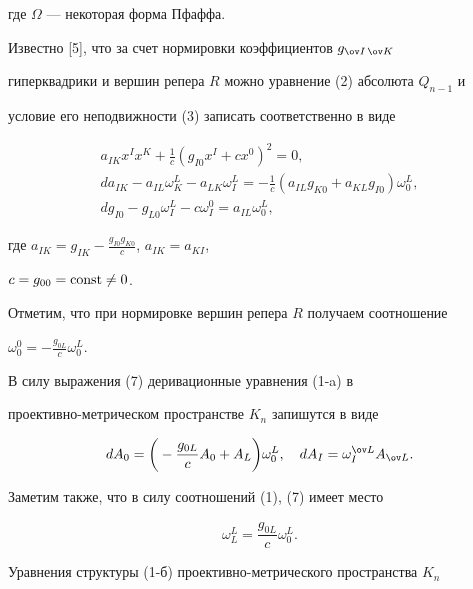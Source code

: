 где $\Omega$ --- некоторая форма Пфаффа. 


 


Известно [5], что за счет нормировки коэффициентов $g_{\ov I\,\ov K}$ 


гиперквадрики и вершин репера $R$ можно уравнение (2) абсолюта $Q_{n-1}$ и 


условие его неподвижности (3) записать соответственно в виде 


\begin{gather} 


a_{IK}x^I x^K+\frac{1}{c}(g_{I0}x^I+cx^0)^2=0,\\ 


% 


da_{IK}-a_{IL}\omega^L_K-a_{LK}\omega^L_I=-\frac{1}{c} 


(a_{IL}g_{K0}+a_{KL}g_{I0})\omega^L_0,\tag{5-а}\\ 


% 


dg_{I0}-g_{L0}\omega^L_I-c\omega^0_I=a_{IL}\omega^L_0,\tag{5-б} 


\end{gather} 


\addtocounter{equation}{1}





\noindent{}где $a_{IK}=g_{IK}-\frac{g_{I0}g_{K0}}{c}$, $a_{IK}=a_{KI}$, 


$c=g_{00}=\operatorname{const}\ne0$. 


Отметим, что при нормировке вершин репера $R$ получаем соотношение 


$\omega^0_0=-\frac{g_{0L}}{c}\omega^L_0$. 


В силу выражения (7) деривационные уравнения (1-a) в 


проективно-метрическом пространстве $K_n$ запишутся в виде 


$$ 


dA_0=\bigg(-\frac{g_{0L}}{c}A_0+A_L \bigg)\omega^L_0,\quad 


dA_I=\omega^{\ov L}_I A_{\ov L}. 


$$ 


Заметим также, что в силу соотношений (1), (7) имеет место 


$$ 


\omega^L_L=\frac{g_{0L}}{c}\omega^L_0. 


$$ 


Уравнения структуры (1-б) проективно-метрического пространства $K_n$ 


